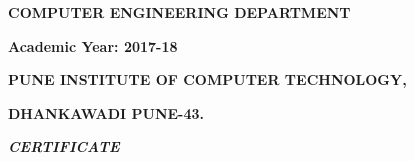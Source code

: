 \documentclass[12pt]{article}
\begin{document}

\tab \par

 \par

 \par

 \par

\begin{Center}
{\fontsize{20pt}{24.0pt}\selectfont \textbf{COMPUTER ENGINEERING DEPARTMENT}\par}
\end{Center}\par

\begin{Center}
{\fontsize{20pt}{24.0pt}\selectfont \textbf{Academic Year: 2017-18}\par}


\newpage

\end{Center}\par


\vspace{\baselineskip}
\begin{Center}
{\fontsize{20pt}{24.0pt}\selectfont \textbf{ }\par}
\end{Center}\par

\begin{Center}
{\fontsize{14pt}{16.8pt}\selectfont \textbf{PUNE INSTITUTE OF COMPUTER TECHNOLOGY,}\par}
\end{Center}\par

\begin{Center}
{\fontsize{14pt}{16.8pt}\selectfont \textbf{DHANKAWADI PUNE-43.}\par}
\end{Center}\par


\vspace{\baselineskip}
\begin{Center}
{\fontsize{26pt}{31.2pt}\selectfont \textbf{\textit{CERTIFICATE}}{\fontsize{14pt}{16.8pt}\selectfont  \par}\par}
\end{Center}\par
\end{document}
